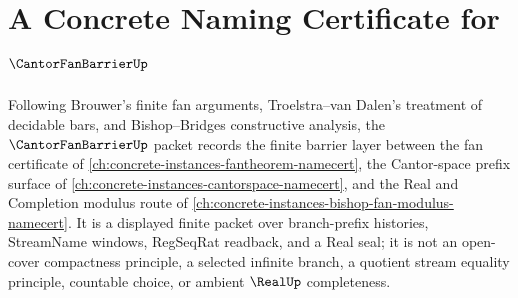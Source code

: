 \chapter{A Concrete Naming Certificate for $\CantorFanBarrierUp$}
\label{ch:concrete-instances-cantor-fan-barrier-namecert}

Following Brouwer's finite fan arguments, Troelstra--van Dalen's treatment of decidable bars, and Bishop--Bridges constructive analysis, the $\CantorFanBarrierUp$ packet records the finite barrier layer between the fan certificate of \autoref{ch:concrete-instances-fantheorem-namecert}, the Cantor-space prefix surface of \autoref{ch:concrete-instances-cantorspace-namecert}, and the Real and Completion modulus route of \autoref{ch:concrete-instances-bishop-fan-modulus-namecert}. It is a displayed finite packet over branch-prefix histories, StreamName windows, RegSeqRat readback, and a Real seal; it is not an open-cover compactness principle, a selected infinite branch, a quotient stream equality principle, countable choice, or ambient $\RealUp$ completeness.

